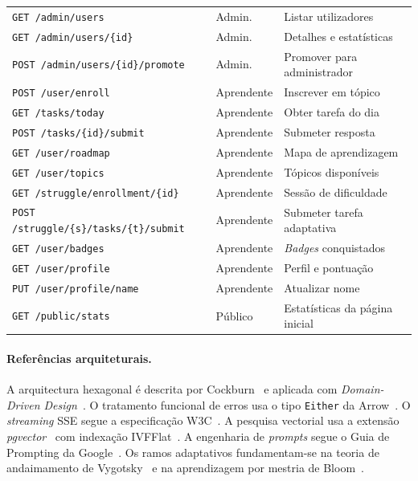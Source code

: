 \begin{table}[ht]
\begin{tabular}{lll}
    \texttt{GET  /admin/users}                   & Admin. & Listar utilizadores \\
    \texttt{GET  /admin/users/\{id\}}            & Admin. & Detalhes e estatísticas \\
    \texttt{POST /admin/users/\{id\}/promote}    & Admin. & Promover para administrador \\
    \midrule
    \texttt{POST /user/enroll}                   & Aprendente & Inscrever em tópico \\
    \texttt{GET  /tasks/today}                   & Aprendente & Obter tarefa do dia \\
    \texttt{POST /tasks/\{id\}/submit}           & Aprendente & Submeter resposta \\
    \texttt{GET  /user/roadmap}                  & Aprendente & Mapa de aprendizagem \\
    \texttt{GET  /user/topics}                   & Aprendente & Tópicos disponíveis \\
    \texttt{GET  /struggle/enrollment/\{id\}}    & Aprendente & Sessão de dificuldade \\
    \texttt{POST /struggle/\{s\}/tasks/\{t\}/submit}& Aprendente & Submeter tarefa adaptativa \\
    \texttt{GET  /user/badges}                   & Aprendente & \textit{Badges} conquistados \\
    \texttt{GET  /user/profile}                  & Aprendente & Perfil e pontuação \\
    \texttt{PUT  /user/profile/name}             & Aprendente & Atualizar nome \\
    \texttt{GET  /public/stats}                  & Público & Estatísticas da página inicial \\
    \bottomrule
  \end{tabular}
\end{table}

\paragraph{Referências arquiteturais.}
A arquitectura hexagonal é descrita por Cockburn~\cite{cockburn2005hexagonal}
e aplicada com \textit{Domain-Driven Design}~\cite{evans2003ddd}.
O tratamento funcional de erros usa o tipo \texttt{Either} da
Arrow~\cite{arrow2024}.
O \textit{streaming} SSE segue a especificação W3C~\cite{w3c2021sse}.
A pesquisa vectorial usa a extensão \textit{pgvector}~\cite{pgvector2024}
com indexação IVFFlat~\cite{johnson2019billion}.
A engenharia de \textit{prompts} segue o Guia de Prompting da
Google~\cite{google2024promptguide}.
Os ramos adaptativos fundamentam-se na teoria de andaimamento de
Vygotsky~\cite{vygotsky1978mind} e na aprendizagem por mestria de
Bloom~\cite{bloom1984mastery}.
